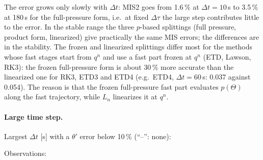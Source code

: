 \documentclass[11pt,a4paper]{article}
\newcommand{\dt}{\Delta t}
\begin{document}
The error grows only slowly with $\dt$: MIS2 goes from 1.6\,\% at $\dt=10$\,s to 3.5\,\% at 180\,s for
the full-pressure form, i.e.\ at fixed $\Delta\tau$ the large step contributes little to the error.
In the stable range the three $p$-based splittings (full pressure, product form, linearized) give
practically the same MIS errors; the differences are in the stability. The frozen and linearized
splittings differ most for the methods whose fast stages start from $q^n$ and use a fast part
frozen at $q^n$ (ETD, Lawson, RK3): the frozen full-pressure form is about 30\,\% more accurate than the
linearized one for RK3, ETD3 and ETD4 (e.g.\ ETD4, $\dt=60$\,s: 0.037 against 0.054). The reason is that
the frozen full-pressure fast part evaluates $p(\Theta)$ along the fast trajectory, while $L_n$
linearizes it at $q^n$.

\paragraph{Large time step.} Largest $\dt$ [s] with a $\theta'$ error below 10\,\% (``--'': none):
\begin{center}\small
{}
\end{center}
Observations:
\end{document}
